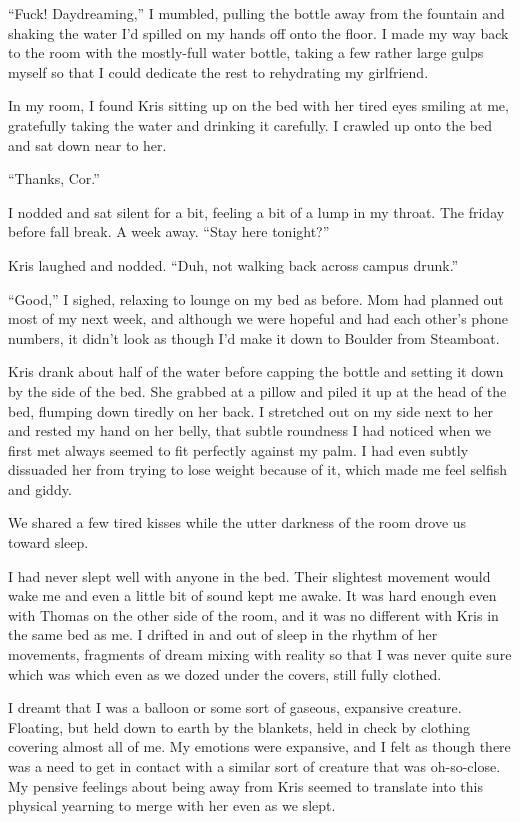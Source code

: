 ``Fuck!  Daydreaming,'' I mumbled, pulling the bottle away from the fountain and shaking the water I'd spilled on my hands off onto the floor.  I made my way back to the room with the mostly-full water bottle, taking a few rather large gulps myself so that I could dedicate the rest to rehydrating my girlfriend.

In my room, I found Kris sitting up on the bed with her tired eyes smiling at me, gratefully taking the water and drinking it carefully.  I crawled up onto the bed and sat down near to her.

``Thanks, Cor.''

I nodded and sat silent for a bit, feeling a bit of a lump in my throat.  The friday before fall break.  A week away.  ``Stay here tonight?''

Kris laughed and nodded.  ``Duh, not walking back across campus drunk.''

``Good,'' I sighed, relaxing to lounge on my bed as before.  Mom had planned out most of my next week, and although we were hopeful and had each other's phone numbers, it didn't look as though I'd make it down to Boulder from Steamboat.

Kris drank about half of the water before capping the bottle and setting it down by the side of the bed.  She grabbed at a pillow and piled it up at the head of the bed, flumping down tiredly on her back.  I stretched out on my side next to her and rested my hand on her belly, that subtle roundness I had noticed when we first met always seemed to fit perfectly against my palm.  I had even subtly dissuaded her from trying to lose weight because of it, which made me feel selfish and giddy.

We shared a few tired kisses while the utter darkness of the room drove us toward sleep.

I had never slept well with anyone in the bed.  Their slightest movement would wake me and even a little bit of sound kept me awake.  It was hard enough even with Thomas on the other side of the room, and it was no different with Kris in the same bed as me.  I drifted in and out of sleep in the rhythm of her movements, fragments of dream mixing with reality so that I was never quite sure which was which even as we dozed under the covers, still fully clothed.

I dreamt that I was a balloon or some sort of gaseous, expansive creature.  Floating, but held down to earth by the blankets, held in check by clothing covering almost all of me.  My emotions were expansive, and I felt as though there was a need to get in contact with a similar sort of creature that was oh-so-close.  My pensive feelings about being away from Kris seemed to translate into this physical yearning to merge with her even as we slept.

